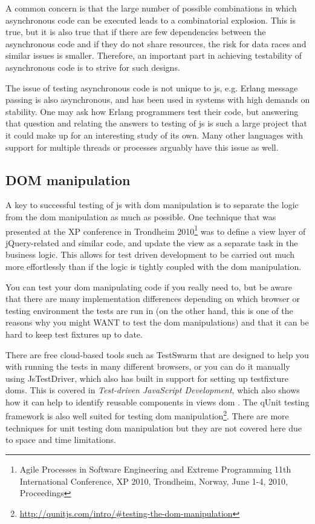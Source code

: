 \documentclass[11pt]{article}
\begin{document}
A common concern is that the large number of possible combinations in which asynchronous code can be executed leads to a combinatorial explosion. This is true, but it is also true that if there are few dependencies between the asynchronous code and if they do not share resources, the risk for data races and similar issues is smaller. Therefore, an important part in achieving testability of asynchronous code is to strive for such designs.

The issue of testing asynchronous code is not unique to \gls{js}, e.g. Erlang message passing is also asynchronous, and has been used in systems with high demands on stability. One may ask how Erlang programmers test their code, but answering that question and relating the answers to testing of \gls{js} is such a large project that it could make up for an interesting study of its own. Many other languages with support for multiple threads or processes arguably have this issue as well.


\subsection{DOM manipulation}

A key to successful testing of \gls{js} with \gls{dom} manipulation is to separate the logic from the \gls{dom} manipulation as much as possible. One technique that was presented at the XP conference in Trondheim 2010\footnote{Agile Processes in Software Engineering and Extreme Programming 11th International Conference, XP 2010, Trondheim, Norway, June 1-4, 2010, Proceedings} was to define a view layer of jQuery-related and similar code, and update the view as a separate task in the business logic. This allows for test driven development to be carried out much more effortlessly than if the logic is tightly coupled with the \gls{dom} manipulation. \cite[question~4]{Ahnve} %

You can test your \gls{dom} manipulating code if you really need to, but be aware that there are many implementation differences depending on which browser or testing environment the tests are run in (on the other hand, this is one of the reasons why you might WANT to test the \gls{dom} manipulations) and that it can be hard to keep test fixtures up to date.

There are free cloud-based tools such as TestSwarm that are designed to help you with running the tests in many different browsers, or you can do it manually using JsTestDriver, which also has built in support for setting up \gls{testfixture} \glspl{dom}. This is covered in \emph{Test-driven JavaScript Development}, which also shows how it can help to identify reusable components in views \gls{dom} \cite[p.~389-435]{Tddjs}. The qUnit testing framework is also well suited for testing \gls{dom} manipulation\footnote{\url{http://qunitjs.com/intro/\#testing-the-dom-manipulation}}. There are more techniques for unit testing \gls{dom} manipulation but they are not covered here due to space and time limitations.
\end{document}
